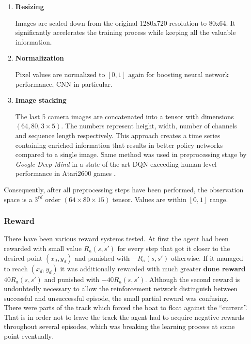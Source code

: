 \begin{enumerate}
\newpage

    \item \textbf{Resizing}
    
    Images are scaled down from the original 1280x720 resolution to 80x64. It significantly accelerates the training process while keeping all the valuable information.
    
    \item \textbf{Normalization}

    Pixel values are normalized to $[0, 1]$ again for boosting neural network performance, CNN in particular.
    
    \item \textbf{Image stacking}
    
    The last 5 camera images are concatenated into a tensor with dimensions $(64, 80, 3 \times 5)$. The numbers represent height, width, number of channels and sequence length respectively. This approach creates a time series containing enriched information that results in better policy networks compared to a single image. Same method was used in preprocessing stage by \emph{Google Deep Mind} in a state-of-the-art DQN exceeding human-level performance in Atari2600 games \cite{DQNAtari}.
\end{enumerate}

Consequently, after all preprocessing steps have been performed, the observation space is a $3^{rd}$ order $(64 \times 80 \times 15)$ tensor. Values are within $[0, 1]$ range.

\subsubsection*{Reward}
\label{sub2:reward}

There have been various reward systems tested. At first the agent had been rewarded with small value $R_a(s, s')$ for every step that got it closer to the desired point $(x_d, y_d)$ and punished with $-R_a(s, s')$ otherwise. If it managed to reach $(x_d, y_d)$ it was additionally rewarded with much greater \textbf{done reward} $40R_a(s, s')$ and punished with $-40R_a(s, s')$. Although the second reward is undoubtedly necessary to allow the reinforcement network distinguish between successful and unsuccessful episode, the small partial reward was confusing. There were parts of the track which forced the boat to float against the ``current''. That is in order not to leave the track the agent had to acquire negative rewards throughout several episodes, which was breaking the learning process at some point eventually.

